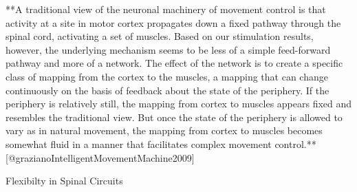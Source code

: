 
**A traditional view of the neuronal machinery of movement control is that activity at a site in motor cortex propagates down a fixed pathway through the spinal cord, activating a set of muscles. Based on our stimulation results, however, the underlying mechanism seems to be less of a simple feed-forward pathway and more of a network. The effect of the network is to create a specific class of mapping from the cortex to the muscles, a mapping that can change continuously on the basis of feedback about the state of the periphery. If the periphery is relatively still, the mapping from cortex to muscles appears fixed and resembles the traditional view. But once the state of the periphery is allowed to vary as in natural movement, the mapping from cortex to muscles becomes somewhat fluid in a manner that facilitates complex movement control.** [@grazianoIntelligentMovementMachine2009] 





Flexibilty in Spinal Circuits 




